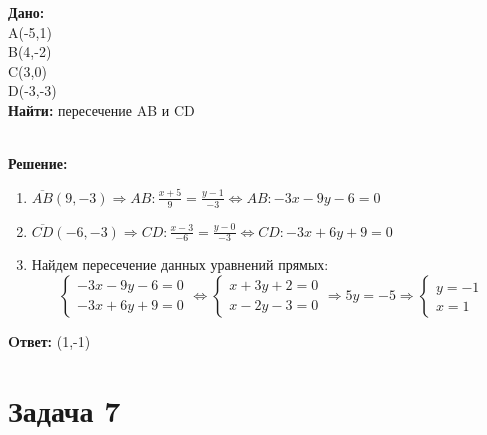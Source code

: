 \documentclass{article}
\begin{document}
\begin{minipage}[t]{0.45\textwidth}

\textbf{Дано:}\\ 
A(-5,1)\\ 
B(4,-2)\\ 
C(3,0)\\ 
D(-3,-3)\\ 
\textbf{Найти: } пересечение AB и CD
\end{minipage}
\begin{minipage}[t]{0.45\textwidth}
  \vspace{-\baselineskip} %

\begin{center}
\end{center}
\end{minipage}
\\
\textbf{Решение:}
\begin{enumerate}
  \item  $\overline{AB}(9,-3) \Rightarrow AB: \displaystyle\frac{x+5}{9} = \displaystyle\frac{y-1}{-3}
    \Leftrightarrow AB: -3x-9y -6 = 0$
  \item  $\overline{CD}(-6,-3) \Rightarrow CD: \displaystyle\frac{x-3}{-6} = \displaystyle\frac{y-0}{-3}
    \Leftrightarrow CD: -3x+ 6y +9 = 0$
  \item Найдем пересечение данных уравнений прямых:
    \[
      \begin{cases}
        -3x - 9y - 6 = 0 \\ 
        -3x + 6y + 9 = 0 
      \end{cases}
      \Leftrightarrow
      \begin{cases}
       x+3y + 2 = 0\\ 
       x-2y -3 = 0
      \end{cases}
      \Rightarrow 5y = -5 \Rightarrow 
      \begin{cases}
        y = -1 \\ 
        x = 1
      \end{cases}
    \]
\end{enumerate}
\textbf{Oтвет: }(1,-1) 

\section*{Задача 7}
\end{document}
